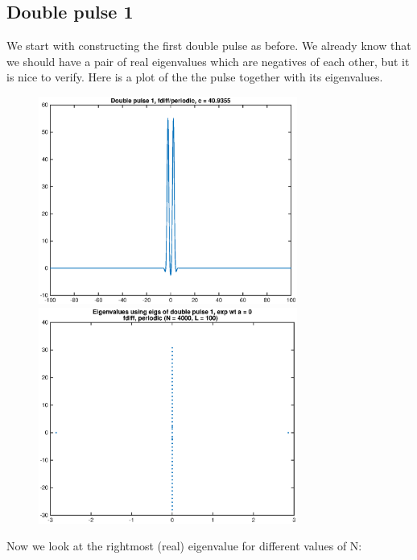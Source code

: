 \documentclass[12pt]{article}
\begin{document}
\subsection*{Double pulse 1}
We start with constructing the first double pulse as before. We already know that we should have a pair of real eigenvalues which are negatives of each other, but it is nice to verify. Here is a plot of the the pulse together with its eigenvalues.
\begin{figure}[H]
\includegraphics[width=8.5cm]{double1.eps}
\includegraphics[width=8.5cm]{double1eigs.eps}
\end{figure}
Now we look at the rightmost (real) eigenvalue for different values of N:
\end{document}
